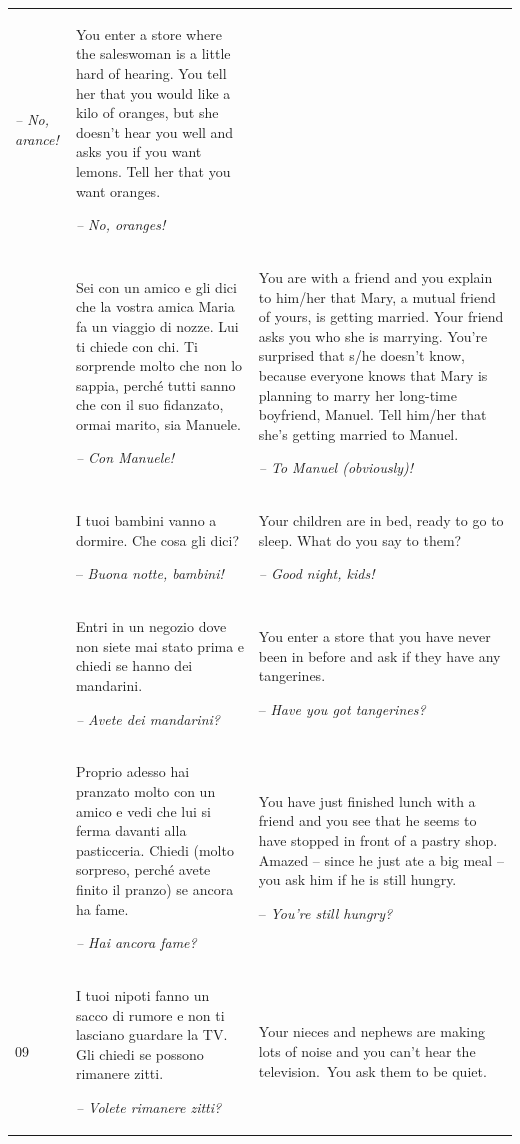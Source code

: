 \begin{xltabular}{\textwidth}{lQQ}
{\itshape -- No, arance!} & You enter a store where the saleswoman is a little hard of hearing. You tell her that you would like a kilo of oranges, but she doesn’t hear you well and asks you if you want lemons. Tell her that you want oranges.

{\itshape -- No, oranges!}\\
 & Sei con un amico e gli dici che la vostra amica Maria fa un viaggio di nozze. Lui ti chiede con chi. Ti sorprende molto che non lo sappia, perché tutti sanno che con il suo fidanzato, ormai marito, sia Manuele.

\textit{-- Con Manuele!} & You are with a friend and you explain to him/her that Mary, a mutual friend of yours, is getting married. Your friend asks you who she is marrying. You're surprised that s/he doesn’t know, because everyone knows that Mary is planning to marry her long-time boyfriend, Manuel. Tell him/her that she’s getting married to Manuel.

{\itshape -- To Manuel (obviously)!}\\
 & I tuoi bambini vanno a dormire. Che cosa gli dici?

-- \textit{Buona notte, bambini!} & Your children are in bed, ready to go to sleep. What do you say to them?

{\itshape -- Good night, kids!}\\
 & Entri in un negozio dove non siete mai stato prima e chiedi se hanno dei mandarini.

{\itshape -- Avete dei mandarini?} & You enter a store that you have never been in before and ask if they have any tangerines.

-- \textit{Have you got tangerines?}\\
 & Proprio adesso hai pranzato molto con un amico e vedi che lui si ferma davanti alla pasticceria. Chiedi (molto sorpreso, perché avete finito il pranzo) se ancora ha fame.

{\itshape -- Hai ancora fame?} & You have just finished lunch with a friend and you see that he seems to have stopped in front of a pastry shop. Amazed -- since he just ate a big meal -- you ask him if he is still hungry.

-- \textit{You’re still hungry?}\\
09 & I tuoi nipoti fanno un sacco di rumore e non ti lasciano guardare la TV. Gli chiedi se possono rimanere zitti.

\textit{-- Volete rimanere zitti?} & Your nieces and nephews are making lots of noise and you can’t hear the television.~You ask them to be quiet.


\end{xltabular}
